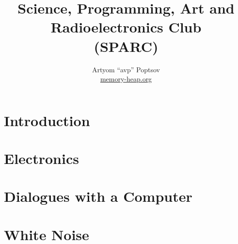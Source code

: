 \documentclass[a4paper,twoside]{book}
\title{Science, Programming, Art and Radioelectronics Club\\(SPARC)}
\author{Artyom ``avp'' Poptsov\\\href{https://memory-heap.org}{memory-heap.org}}
\begin{document}
\maketitle

\tableofcontents

\chapter*{Introduction}




\chapter{Electronics}
\label{chapter:electronics}








\chapter{Dialogues with a Computer}
\label{chapter:dialogues-with-computer}









\chapter{White Noise}
\label{chapter:white-noise}




\end{document}
